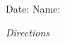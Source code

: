 \documentclass[12pt]{article}
\begin{document}
\thispagestyle{fancy}

Date:\underline{\hspace*{4cm}} \hfill 
Name:\underline{\hspace*{4cm}}

\textit{Directions} 

\end{document}
